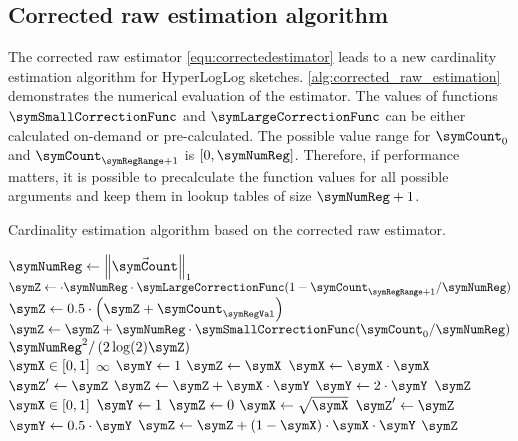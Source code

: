\documentclass[a4paper]{scrartcl}
\begin{document}
\subsection{Corrected raw estimation algorithm}
The corrected raw estimator \eqref{equ:correctedestimator} leads to a new cardinality estimation algorithm for HyperLogLog sketches. \cref{alg:corrected_raw_estimation} demonstrates the numerical evaluation of the estimator. The values of functions $\symSmallCorrectionFunc$ and $\symLargeCorrectionFunc$ can be either calculated on-demand or pre-calculated. The possible value range for $\symCount_0$ and $\symCount_{\symRegRange+1}$ is $[0, \symNumReg]$. Therefore, if performance matters, it is possible to precalculate the function values for all possible arguments and keep them in lookup tables of size $\symNumReg+1$. 

\begin{algorithm}
\caption{Cardinality estimation algorithm based on the corrected raw estimator.}
\label{alg:corrected_raw_estimation}
\begin{algorithmic}
\State $\symNumReg \gets \left\Vert\vec{\symCount}\right\Vert_1$
\State $\symZ\gets \cdot \symNumReg\cdot\symLargeCorrectionFunc(1 - \symCount_{\symRegRange+1}/\symNumReg)$
\State $\symZ\gets0.5\cdot\left(\symZ + \symCount_\symRegVal\right)$
\EndFor
\State $\symZ\gets\symZ+\symNumReg\cdot\symSmallCorrectionFunc(\symCount_0/\symNumReg)$
\State \Return$\symNumReg^2 / \left(2\log(2)\symZ\right)$
\EndFunction
\\
\Function {$\symSmallCorrectionFunc$}{$\symX$}
\Comment $\symX\in[0,1]$
\State\Return$\infty$
\EndIf
\State $\symY\gets1$
\State $\symZ\gets\symX$
\Repeat
\State $\symX\gets\symX\cdot\symX$
\State $\symZ'\gets\symZ$
\State $\symZ\gets\symZ + \symX\cdot\symY$
\State $\symY\gets2\cdot\symY$
\State\Return$\symZ$
\EndFunction
\\
\Function {$\symLargeCorrectionFunc$}{$\symX$}
\Comment $\symX\in[0,1]$
\State $\symY\gets1$
\State $\symZ\gets0$
\Repeat
\State $\symX\gets\sqrt{\symX}$
\State $\symZ'\gets\symZ$
\State $\symY\gets0.5\cdot\symY$
\State $\symZ\gets\symZ + \left(1-\symX\right)\cdot\symX\cdot\symY$
\State\Return$\symZ$
\EndFunction
\end{algorithmic}
\end{algorithm}
\end{document}
